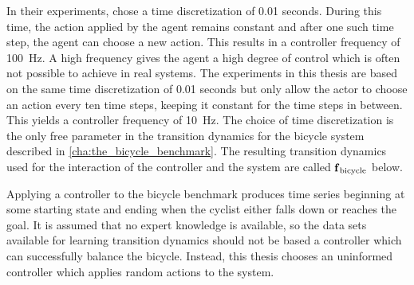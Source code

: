 In their experiments, \citeauthor{randlov_learning_1998} chose a time discretization of 0.01 seconds.
During this time, the action applied by the agent remains constant and after one such time step, the agent can choose a new action.
This results in a controller frequency of \SI[mode=text]{100}{\Hz}.
A high frequency gives the agent a high degree of control which is often not possible to achieve in real systems.
The experiments in this thesis are based on the same time discretization of 0.01 seconds but only allow the actor to choose an action every ten time steps, keeping it constant for the time steps in between.
This yields a controller frequency of \SI[mode=text]{10}{\Hz}.
The choice of time discretization is the only free parameter in the transition dynamics for the bicycle system described in \cref{cha:the_bicycle_benchmark}.
The resulting transition dynamics used for the interaction of the controller and the system are called $\operatorname{\operatorname{\mathbf{f}}_{\text{bicycle}}}$ below.

Applying a controller to the bicycle benchmark produces time series beginning at some starting state and ending when the cyclist either falls down or reaches the goal.
It is assumed that no expert knowledge is available, so the data sets available for learning transition dynamics should not be based a controller which can successfully balance the bicycle.
Instead, this thesis chooses an uninformed controller which applies random actions to the system.

